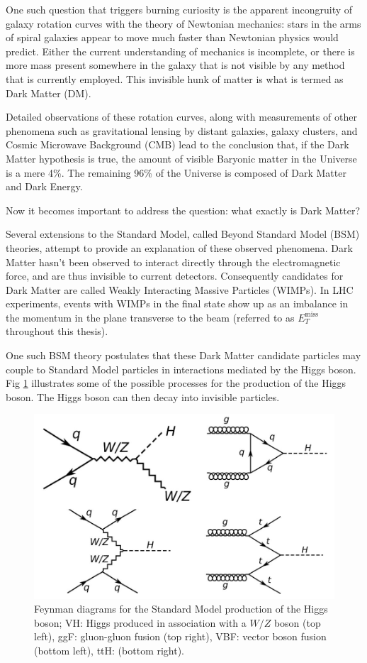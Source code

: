 \documentclass[11pt,a4paper,openright,twoside]{report}
\newcommand{\met}{$E_T^{\mathrm{miss}}$ }
\begin{document}
One such question that triggers burning curiosity is the apparent incongruity of galaxy rotation curves with the theory of Newtonian mechanics: stars in the arms of spiral galaxies appear to move much faster than Newtonian physics would predict. Either the current understanding of mechanics is incomplete, or there is more mass present somewhere in the galaxy that is not visible by any method that is currently employed. This invisible hunk of matter is what is termed as Dark Matter (DM).

Detailed observations of these rotation curves, along with measurements of other phenomena such as gravitational lensing by distant galaxies, galaxy clusters, and Cosmic Microwave Background (CMB) lead to the conclusion that, if the Dark Matter hypothesis is true, the amount of visible Baryonic matter in the Universe is a mere 4\%. The remaining 96\% of the Universe is composed of Dark Matter and Dark Energy.

Now it becomes important to address the question: what exactly is Dark Matter? 

Several extensions to the Standard Model, called Beyond Standard Model (BSM) theories, attempt to provide an explanation of these observed phenomena. Dark Matter hasn't been observed to interact directly through the electromagnetic force, and are thus invisible to current detectors. Consequently candidates for Dark Matter are called Weakly Interacting Massive Particles (WIMPs). In LHC experiments, events with WIMPs in the final state show up as an imbalance in the momentum in the plane transverse to the beam (referred to as \met throughout this thesis).

One such BSM theory postulates that these Dark Matter candidate particles may couple to Standard Model particles in interactions mediated by the Higgs boson. Fig \ref{fig:higgs} illustrates some of the possible processes for the production of the Higgs boson. The Higgs boson can then decay into invisible particles.

\begin{figure}[H]
\centering
\includegraphics[width=0.5\linewidth]{higgs_production.png}
\caption{Feynman diagrams for the Standard Model production of the Higgs boson; VH: Higgs produced in association with a $W/Z$ boson (top left), ggF: gluon-gluon fusion (top right), VBF: vector boson fusion (bottom left), ttH: (bottom right).}
\label{fig:higgs}
\end{figure}
\end{document}
